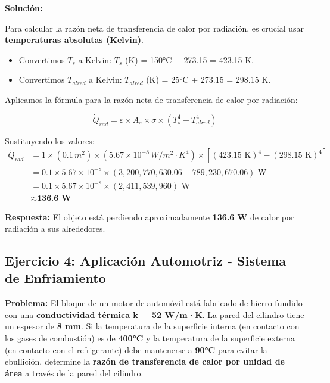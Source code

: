 \documentclass{article}
\begin{document}
    \textbf{Solución:}

    Para calcular la razón neta de transferencia de calor por radiación, es crucial usar \textbf{temperaturas absolutas (Kelvin)}.

    \begin{itemize}
        \item Convertimos $T_s$ a Kelvin: $T_s$ (K) = 150°C + 273.15 = 423.15 K.
        \item Convertimos $T_{alred}$ a Kelvin: $T_{alred}$ (K) = 25°C + 273.15 = 298.15 K.
    \end{itemize}

    Aplicamos la fórmula para la razón neta de transferencia de calor por radiación:

    \begin{equation}
    \dot{Q}_{rad} = \varepsilon \times A_s \times \sigma \times (T_s^4 - T_{alred}^4)
    \end{equation}

    Sustituyendo los valores:
    \begin{align}
    \dot{Q}_{rad} &= 1 \times (0.1 \,  m^2) \times (5.67 \times 10^{-8}  \, W/m^2 \cdot K^4) \times [(423.15 \text{ K})^4 - (298.15 \text{ K})^4] \\
    &= 0.1 \times 5.67 \times 10^{-8} \times (3,200,770,630.06 - 789,230,670.06) \text{ W} \\
    &= 0.1 \times 5.67 \times 10^{-8} \times (2,411,539,960) \text{ W} \\
    &\approx \textbf{136.6 W}
    \end{align}

    \textbf{Respuesta:} El objeto está perdiendo aproximadamente \textbf{136.6 W} de calor por radiación a sus alrededores.

    \subsection{Ejercicio 4: Aplicación Automotriz - Sistema de Enfriamiento}

    \textbf{Problema:} El bloque de un motor de automóvil está fabricado de hierro fundido con una \textbf{conductividad térmica k = 52 W/m·K}. La pared del cilindro tiene un espesor de \textbf{8 mm}. Si la temperatura de la superficie interna (en contacto con los gases de combustión) es de \textbf{400°C} y la temperatura de la superficie externa (en contacto con el refrigerante) debe mantenerse a \textbf{90°C} para evitar la ebullición, determine la \textbf{razón de transferencia de calor por unidad de área} a través de la pared del cilindro.
\end{document}
